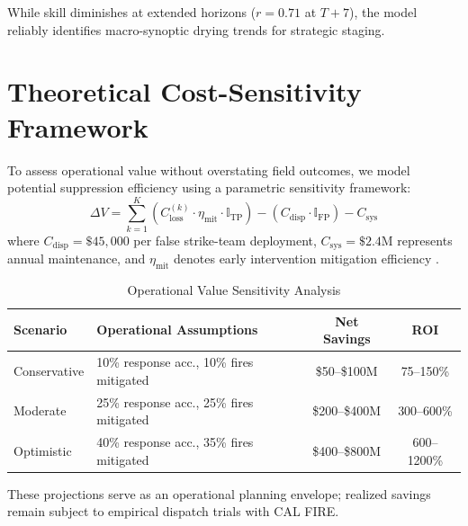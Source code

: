 \documentclass[journal]{IEEEtran}
\begin{document}
While skill diminishes at extended horizons ($r=0.71$ at $T+7$), the model reliably identifies macro-synoptic drying trends for strategic staging.

\section{Theoretical Cost-Sensitivity Framework}
To assess operational value without overstating field outcomes, we model potential suppression efficiency using a parametric sensitivity framework:
\begin{equation}
    \Delta V = \sum_{k=1}^K \left( C_{\text{loss}}^{(k)} \cdot \eta_{\text{mit}} \cdot \mathbb{I}_{\text{TP}} \right) - \left( C_{\text{disp}} \cdot \mathbb{I}_{\text{FP}} \right) - C_{\text{sys}}
\end{equation}
where $C_{\text{disp}} = \$45,000$ per false strike-team deployment, $C_{\text{sys}} = \$2.4\text{M}$ represents annual maintenance, and $\eta_{\text{mit}}$ denotes early intervention mitigation efficiency \cite{thompson2011}.

\begin{table}[htbp]
\caption{\color{Burgundy}Operational Value Sensitivity Analysis}
\label{tab:cost}
\centering
{}
\begin{tabular}{llcc}
\toprule
\rowcolor{LightGold}
\textbf{\color{Burgundy}Scenario} & \textbf{\color{Burgundy}Operational Assumptions} & \textbf{\color{Burgundy}Net Savings} & \textbf{\color{Burgundy}ROI} \\
\midrule
Conservative & 10\% response acc., 10\% fires mitigated & \$50--\$100M & 75--150\% \\
Moderate & 25\% response acc., 25\% fires mitigated & \$200--\$400M & 300--600\% \\
Optimistic & 40\% response acc., 35\% fires mitigated & \$400--\$800M & 600--1200\% \\
\bottomrule
\end{tabular}
\end{table}

These projections serve as an operational planning envelope; realized savings remain subject to empirical dispatch trials with CAL FIRE.

\end{document}

